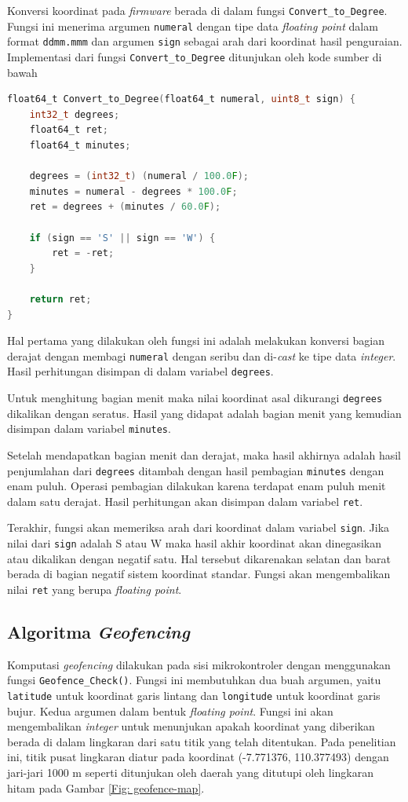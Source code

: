 Konversi koordinat pada \textit{firmware} berada di dalam fungsi \texttt{Convert\_to\_Degree}. Fungsi ini menerima argumen \texttt{numeral} dengan tipe data \textit{floating point} dalam format \texttt{ddmm.mmm} dan argumen \texttt{sign} sebagai arah dari koordinat hasil penguraian. Implementasi dari fungsi \texttt{Convert\_to\_Degree} ditunjukan oleh kode sumber di bawah
\begin{lstlisting}[language=c]
float64_t Convert_to_Degree(float64_t numeral, uint8_t sign) {
	int32_t degrees;
	float64_t ret;
	float64_t minutes;
	
	degrees = (int32_t) (numeral / 100.0F);
	minutes = numeral - degrees * 100.0F;
	ret = degrees + (minutes / 60.0F);
	
	if (sign == 'S' || sign == 'W') {
		ret = -ret;
	}
	
	return ret;
}
\end{lstlisting}

Hal pertama yang dilakukan oleh fungsi ini adalah melakukan konversi bagian derajat dengan membagi \texttt{numeral} dengan seribu dan di-\textit{cast} ke tipe data \textit{integer}. Hasil perhitungan disimpan di dalam variabel \texttt{degrees}.

Untuk menghitung bagian menit maka nilai koordinat asal dikurangi \texttt{degrees} dikalikan dengan seratus. Hasil yang didapat adalah bagian menit yang kemudian disimpan dalam variabel \texttt{minutes}.

Setelah mendapatkan bagian menit dan derajat, maka hasil akhirnya adalah hasil penjumlahan dari \texttt{degrees} ditambah dengan hasil pembagian \texttt{minutes} dengan enam puluh. Operasi pembagian dilakukan karena terdapat enam puluh menit dalam satu derajat. Hasil perhitungan akan disimpan dalam variabel \texttt{ret}.

Terakhir, fungsi akan memeriksa arah dari koordinat dalam variabel \texttt{sign}. Jika nilai dari \texttt{sign} adalah S atau W maka hasil akhir koordinat akan dinegasikan atau dikalikan dengan negatif satu. Hal tersebut dikarenakan selatan dan barat berada di bagian negatif sistem koordinat standar. Fungsi akan mengembalikan nilai \texttt{ret} yang berupa \textit{floating point}.

\subsection{Algoritma \textit{Geofencing}}
Komputasi \textit{geofencing} dilakukan pada sisi mikrokontroler dengan menggunakan fungsi \texttt{Geofence\_Check()}. Fungsi ini membutuhkan dua buah argumen, yaitu \texttt{latitude} untuk koordinat garis lintang dan \texttt{longitude} untuk koordinat garis bujur. Kedua argumen dalam bentuk \textit{floating point}. Fungsi ini akan mengembalikan \textit{integer} untuk menunjukan apakah koordinat yang diberikan berada di dalam lingkaran dari satu titik yang telah ditentukan. Pada penelitian ini, titik pusat lingkaran diatur pada koordinat (-7.771376, 110.377493) dengan jari-jari 1000 m seperti ditunjukan oleh daerah yang ditutupi oleh lingkaran hitam pada Gambar  \ref{Fig: geofence-map}.

